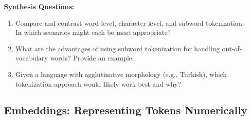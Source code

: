 \begin{questionbox}
\textbf{Synthesis Questions:}
\begin{enumerate}
    \item Compare and contrast word-level, character-level, and subword tokenization. In which scenarios might each be most appropriate?
    \item What are the advantages of using subword tokenization for handling out-of-vocabulary words? Provide an example.
    \item Given a language with agglutinative morphology (e.g., Turkish), which tokenization approach would likely work best and why?
\end{enumerate}
\end{questionbox}


\subsection{Embeddings: Representing Tokens Numerically}


